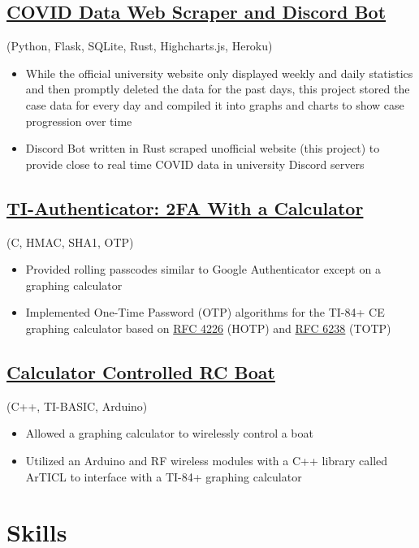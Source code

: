 \documentclass{article}
\begin{document}
\subsection{\href{https://github.com/example/}{COVID Data Web Scraper and Discord Bot}} (Python, Flask, SQLite, Rust, Highcharts.js, Heroku)
\begin{itemize}
    \item While the official university website only displayed weekly and daily statistics and then promptly deleted the data for the past days, this project stored the case data for every day and compiled it into graphs and charts to show case progression over time
    \item Discord Bot written in Rust scraped unofficial website (this project) to provide close to real time COVID data in university Discord servers
\end{itemize}

\subsection{\href{https://github.com/example}{TI-Authenticator: 2FA With a Calculator}} (C, HMAC, SHA1, OTP)
\begin{itemize}
    \item Provided rolling passcodes similar to Google Authenticator except on a graphing calculator
    \item Implemented One-Time Password (OTP) algorithms for the TI-84+ CE graphing calculator based on \href{https://tools.ietf.org/html/rfc4226}{RFC 4226} (HOTP) and \href{https://tools.ietf.org/html/rfc6238}{RFC 6238} (TOTP)
\end{itemize}

\subsection{\href{https://github.com/}{Calculator Controlled RC Boat}} (C++, TI-BASIC, Arduino)
\begin{itemize}
    \item Allowed a graphing calculator to wirelessly control a boat
    \item Utilized an Arduino and RF wireless modules with a C++ library called ArTICL to interface with a TI-84+ graphing calculator
\end{itemize}

\section{Skills}
\end{document}
